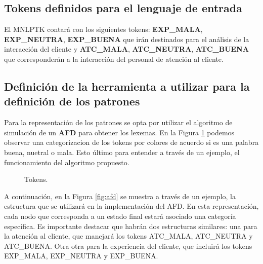 \documentclass[10pt,times,twocolumn]{article}
\begin{document}
\subsection{Tokens definidos para el lenguaje de entrada}
El MNLPTK contará con los siguientes tokens: \textbf{EXP\_MALA}, \textbf{EXP\_NEUTRA}, \textbf{EXP\_BUENA} que irán destinados para el análisis de la interacción del cliente y \textbf{ATC\_MALA}, \textbf{ATC\_NEUTRA}, \textbf{ATC\_BUENA} que corresponderán a la interacción del personal de atención al cliente.

\subsection{Definición de la herramienta a utilizar para la definición de los patrones}
Para la representación de los patrones se opta por utilizar el algoritmo de simulación de un \textbf{AFD} para obtener los lexemas. En la Figura \ref{fig:tokens} podemos observar una categorizacion de los tokens por colores de acuerdo si es una palabra buena, nuetral o mala. Esto último para entender a través de un ejemplo, el funcionamiento del algoritmo propuesto. 

\setcounter{i}{0}


\begin{figure}[H]
  \centering
	\caption{Tokens.}
	\label{fig:tokens}
\end{figure}

A continuación, en la Figura \ref{fig:afd} se muestra a través de un ejemplo, la estructura que se utilizará en la implementación del AFD. En esta representación, cada nodo que corresponda a un estado final estará asociado una categoría específica. Es importante destacar que habrán dos estructuras similares: una para la atención al cliente, que manejará los tokens ATC\_MALA, ATC\_NEUTRA y ATC\_BUENA. Otra otra para la experiencia del cliente, que incluirá los tokens EXP\_MALA, EXP\_NEUTRA y EXP\_BUENA.
\end{document}
